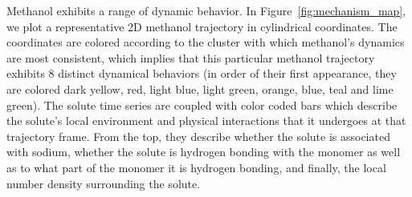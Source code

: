 \documentclass{article}
\begin{document}
  Methanol exhibits a range of dynamic behavior. In Figure~\ref{fig:mechanism_map}, we
  plot a representative 2D methanol trajectory in cylindrical coordinates. The coordinates
  are colored according to the cluster with which methanol's dynamics are most consistent,
  which implies that this particular methanol trajectory exhibits 8 distinct dynamical 
  behaviors (in order of their first appearance, they are colored dark yellow, red, light
  blue, light green, orange, blue, teal and lime green). The solute time series are coupled
  with color coded bars which describe the solute's local environment and physical 
  interactions that it undergoes at that trajectory frame. From the top, they describe 
  whether the solute is associated with sodium, whether the solute is hydrogen bonding
  with the monomer as well as to what part of the monomer it is hydrogen bonding, and 
  finally, the local number density surrounding the solute. 
\end{document}

